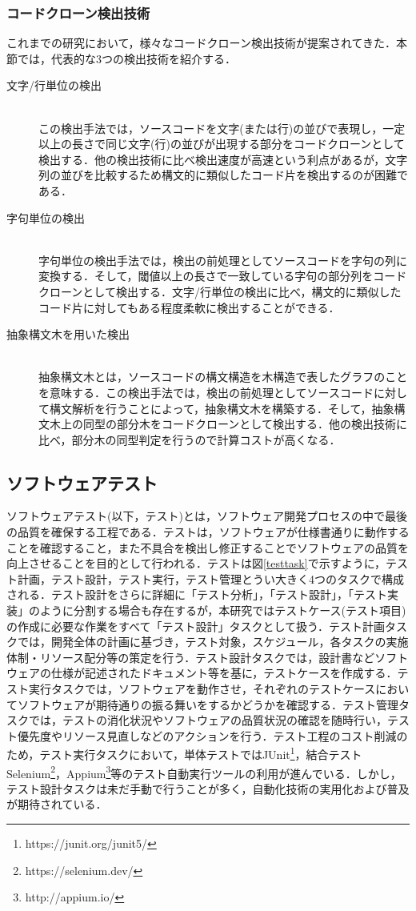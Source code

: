 \documentclass[12pt]{jarticle} %
\begin{document}
\subsubsection{コードクローン検出技術}
これまでの研究において，様々なコードクローン検出技術が提案されてきた\cite{c6,c1}．本節では，代表的な3つの検出技術を紹介する．

\begin{description}
\item[文字/行単位の検出]~\\
この検出手法では，ソースコードを文字(または行)の並びで表現し，一定以上の長さで同じ文字(行)の並びが出現する部分をコードクローンとして検出する．他の検出技術に比べ検出速度が高速という利点があるが，文字列の並びを比較するため構文的に類似したコード片を検出するのが困難である．
\item[字句単位の検出]~\\
字句単位の検出手法では，検出の前処理としてソースコードを字句の列に変換する．そして，閾値以上の長さで一致している字句の部分列をコードクローンとして検出する．文字/行単位の検出に比べ，構文的に類似したコード片に対してもある程度柔軟に検出することができる．
\item[抽象構文木を用いた検出]~\\
抽象構文木とは，ソースコードの構文構造を木構造で表したグラフのことを意味する．この検出手法では，検出の前処理としてソースコードに対して構文解析を行うことによって，抽象構文木を構築する．そして，抽象構文木上の同型の部分木をコードクローンとして検出する．他の検出技術に比べ，部分木の同型判定を行うので計算コストが高くなる．
\end{description}

\subsection{ソフトウェアテスト}
ソフトウェアテスト(以下，テスト)とは，ソフトウェア開発プロセスの中で最後の品質を確保する工程である．テストは，ソフトウェアが仕様書通りに動作することを確認すること，また不具合を検出し修正することでソフトウェアの品質を向上させることを目的として行われる．テストは図\ref{testtask}で示すように，テスト計画，テスト設計，テスト実行，テスト管理とうい大きく4つのタスクで構成される．テスト設計をさらに詳細に「テスト分析」，「テスト設計」，「テスト実装」のように分割する場合も存在するが，本研究ではテストケース(テスト項目)の作成に必要な作業をすべて「テスト設計」タスクとして扱う．テスト計画タスクでは，開発全体の計画に基づき，テスト対象，スケジュール，各タスクの実施体制・リソース配分等の策定を行う．テスト設計タスクでは，設計書などソフトウェアの仕様が記述されたドキュメント等を基に，テストケースを作成する．テスト実行タスクでは，ソフトウェアを動作させ，それぞれのテストケースにおいてソフトウェアが期待通りの振る舞いをするかどうかを確認する．テスト管理タスクでは，テストの消化状況やソフトウェアの品質状況の確認を随時行い，テスト優先度やリソース見直しなどのアクションを行う．テスト工程のコスト削減のため，テスト実行タスクにおいて，単体テストではJUnit\footnote{https://junit.org/junit5/}，結合テストSelenium\footnote{https://selenium.dev/}，Appium\footnote{http://appium.io/}等のテスト自動実行ツールの利用が進んでいる．しかし，テスト設計タスクは未だ手動で行うことが多く，自動化技術の実用化および普及が期待されている．
\end{document}
